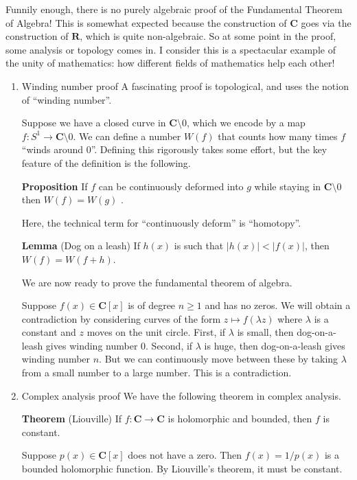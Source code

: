 \documentclass[11pt]{article}
\begin{document}
Funnily enough, there is no purely algebraic proof of the Fundamental Theorem of Algebra!
This is somewhat expected because the construction of \(\mathbf{C}\) goes via the construction of \(\mathbf{R}\), which is quite non-algebraic.
So at some point in the proof, some analysis or topology comes in.
I consider this is a spectacular example of the unity of mathematics: how different fields of mathematics help each other!
\begin{enumerate}
\item Winding number proof
\label{sec:orgc875969}
A fascinating proof is topological, and uses the notion of ``winding number''.

Suppose we have a closed curve in \(\mathbf{C} \setminus 0\), which we encode by a map \(f \colon S^1 \to \mathbf{C} \setminus 0\).
We can define a number \(W(f)\) that counts how many times \(f\) ``winds around 0''.
Defining this rigorously takes some effort, but the key feature of the definition is the following.

\textbf{\textbf{Proposition}} If \(f\) can be continuously deformed into \(g\) while staying in \(\mathbf{C} \setminus 0\) then \(W(f) = W(g)\) .

Here, the technical term for ``continuously deform'' is ``homotopy''.

\textbf{\textbf{Lemma}} (Dog on a leash)
If \(h(x)\) is such that \(|h(x)| < |f(x)|\), then \(W(f) = W(f+h)\).

We are now ready to prove the fundamental theorem of algebra.

Suppose \(f(x) \in \mathbf{C}[x]\) is of degree \(n \geq 1\) and has no zeros.
We will obtain a contradiction by considering curves of the form \(z \mapsto f(\lambda z)\) where \(\lambda\) is a constant and \(z\) moves on the unit circle.
First, if \(\lambda\) is small, then dog-on-a-leash gives winding number 0.
Second, if \(\lambda\) is huge, then dog-on-a-leash gives winding number \(n\).
But we can continuously move between these by taking \(\lambda\) from a small number to a large number.
This is a contradiction.
\item Complex analysis proof
\label{sec:org56955c2}
We have the following theorem in complex analysis.

\textbf{\textbf{Theorem}} (Liouville)
If \(f \colon \mathbf{C} \to \mathbf{C}\) is holomorphic and bounded, then \(f\) is constant.

Suppose \(p(x) \in \mathbf{C}[x]\) does not have a zero.
Then \(f(x) = 1/p(x)\) is a bounded holomorphic function.
By Liouville's theorem, it must be constant.
\end{enumerate}
\end{document}
